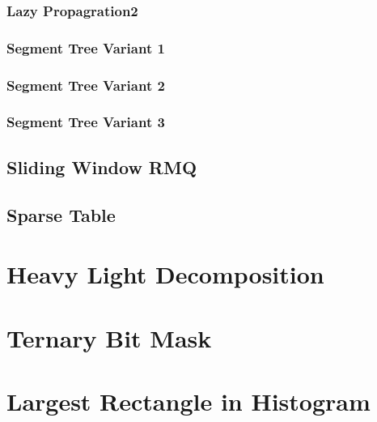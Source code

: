 \documentclass[11pt]{report}
\begin{document}
\subsubsection{Lazy Propagration2}

\subsubsection{Segment Tree Variant 1}

\subsubsection{Segment Tree Variant 2}

\subsubsection{Segment Tree Variant 3}

\subsection{Sliding Window RMQ}

\subsection{Sparse Table}


\section{Heavy Light Decomposition}


\section{Ternary Bit Mask}


\section{Largest Rectangle in Histogram }
\end{document}
